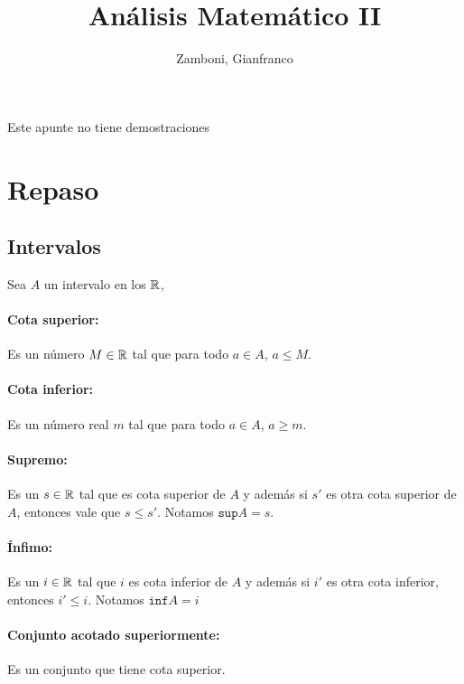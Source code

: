 

\title{Análisis Matemático II}

\author{Zamboni, Gianfranco}







\maketitle

Este apunte no tiene demostraciones
\tableofcontents

\newpage
\setcounter{page}{1}

\section{Repaso}
\subsection{Intervalos}
Sea $A$ un intervalo en los $\mathbb{R}$,
 
\paragraph{Cota superior:} Es un número  $M\in\mathbb{R}$ tal que para todo $a\in A$, $a\leq M$.

\paragraph{Cota inferior:} Es un número real $m$ tal que para todo $a\in A$, $a\geq m$.

\paragraph{Supremo:} Es un $s\in\mathbb{R}$ tal que es cota superior de $A$ y además si $s'$ es otra cota superior de $A$, entonces vale que $s\leq s'$. Notamos $\texttt{sup}{A} = s$.

\paragraph{Ínfimo:} Es un $i\in\mathbb{R}$ tal que $i$ es cota inferior de $A$ y además si $i'$ es otra cota inferior, entonces $i' \leq i$. Notamos $\texttt{inf}{A} = i$

\paragraph{Conjunto acotado superiormente: } Es un conjunto que tiene cota superior.


